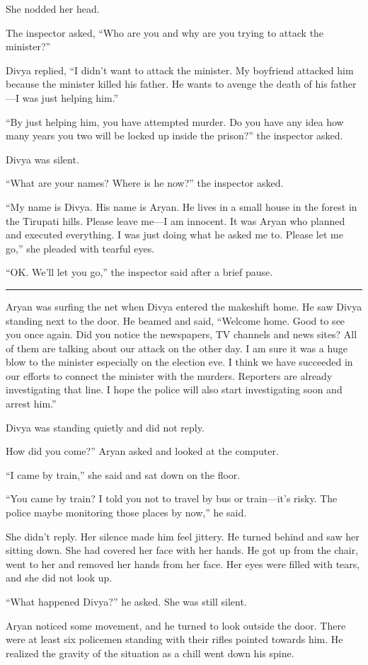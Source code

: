 She nodded her head.

The inspector asked, “Who are you and why are you trying to attack the
minister?”

Divya replied, “I didn't want to attack the minister. My boyfriend attacked him
because the minister killed his father. He wants to avenge the death of his
father—I was just helping him.”

“By just helping him, you have attempted murder. Do you have any idea how many
years you two will be locked up inside the prison?” the inspector asked.

Divya was silent.

“What are your names? Where is he now?” the inspector asked.

“My name is Divya. His name is Aryan. He lives in a small house in the forest in
the Tirupati hills. Please leave me—I am innocent. It was Aryan who planned
and executed everything. I was just doing what he asked me to. Please let me
go,” she pleaded with tearful eyes.

“OK. We'll let you go,” the inspector said after a brief pause.

\fancybreak{* * *}

Aryan was surfing the net when Divya entered the makeshift home. He saw Divya
standing next to the door. He beamed and said, “Welcome home. Good to see you
once again. Did you notice the newspapers, TV channels and news sites? All of
them are talking about our attack on the other day. I am sure it was a huge blow
to the minister especially on the election eve. I think we have succeeded in our
efforts to connect the minister with the murders. Reporters are already
investigating that line. I hope the police will also start investigating soon
and arrest him.”

Divya was standing quietly and did not reply.

How did you come?” Aryan asked and looked at the computer.

“I came by train,” she said and sat down on the floor.

“You came by train? I told you not to travel by bus or train—it's risky. The
police maybe monitoring those places by now,” he said.

She didn't reply. Her silence made him feel jittery. He turned behind and saw
her sitting down. She had covered her face with her hands. He got up from the
chair, went to her and removed her hands from her face. Her eyes were filled
with tears, and she did not look up.

“What happened Divya?” he asked. She was still silent.

Aryan noticed some movement, and he turned to look outside the door. There were
at least six policemen standing with their rifles pointed towards him. He
realized the gravity of the situation as a chill went down his spine.

